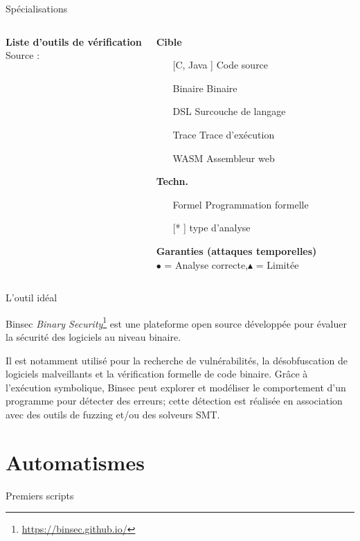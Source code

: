 \documentclass{backend/backend}
\begin{document}
\begin{frame}{Spécialisations}
\begin{columns}
    \textbf{Liste d’outils de vérification}\\[1ex]
    Source : \cite{notThatHardCT}\\[2ex]
    \begin{scriptsize}
        
        \textbf{Cible}
        \begin{itemize}
        \item[[C, Java]] Code source
        \item[Binaire] Binaire
        \item[DSL] Surcouche de langage
        \item[Trace] Trace d'exécution
        \item[WASM] Assembleur web
    \end{itemize}
    \textbf{Techn.}
    \begin{itemize}
        \item[Formel] Programmation formelle 
        \item[[*]] type d'analyse
    \end{itemize}
    \textbf{Garanties (attaques temporelles)}\\
        $\bullet$ = Analyse correcte,$\blacktriangle$ =  Limitée
    \end{scriptsize}
    \end{columns}
\end{frame}

\begin{frame}{L'outil idéal}
    \begin{exampleblock}{Binsec}
       \textit{Binary Security}\footnote{\url{https://binsec.github.io/}} est une plateforme open source développée pour évaluer la sécurité des logiciels au niveau binaire. 
       
       Il est notamment utilisé pour la recherche de vulnérabilités, la désobfuscation de logiciels malveillants et la vérification formelle de code binaire. Grâce à l'exécution symbolique, Binsec peut explorer et modéliser le comportement d'un programme pour détecter des erreurs; cette détection est réalisée en association avec des outils de fuzzing et/ou des solveurs SMT.
    \end{exampleblock}
\end{frame}

\section{Automatismes}
\begin{frame}{Premiers scripts}
    
\end{frame}
\end{document}
